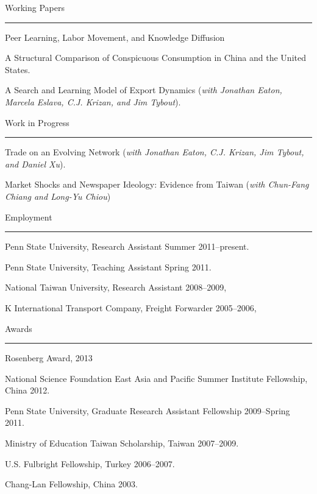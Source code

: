 \documentclass[letterpaper]{article}
\renewenvironment{itemize}{
    \begin{list}{}{
            \setlength{\leftmargin}{1.5em}
            \setlength{\parskip}{0pt}
            \setlength{\parsep}{0pt}
        }
    }{
    \end{list}
}
\begin{document}
\vspace{4mm}
{\Large Working Papers}
\vspace{1mm}
\hrule
\begin{itemize}
    \item Peer Learning, Labor Movement, and Knowledge Diffusion
    \item A Structural Comparison of Conspicuous Consumption in China and the United States.
    \item A Search and Learning Model of Export Dynamics (\emph{with Jonathan Eaton, Marcela Eslava, C.J. Krizan, and Jim Tybout}).
\end{itemize}

\vspace{4mm}
{\Large Work in Progress}
\vspace{1mm}
\hrule
\begin{itemize}
    \item Trade on an Evolving Network (\emph{with Jonathan Eaton, C.J. Krizan, Jim Tybout, and Daniel Xu}).
    \item Market Shocks and Newspaper Ideology: Evidence from Taiwan (\emph{with Chun-Fang Chiang and Long-Yu Chiou})
\end{itemize}

\vspace{4mm}
{\Large Employment}
\hrule
\begin{itemize}
    \item Penn State University, Research Assistant Summer 2011--present.
    \item Penn State University, Teaching Assistant Spring 2011.
    \item National Taiwan University, Research Assistant 2008--2009,
    \item K International Transport Company, Freight Forwarder 2005--2006,
\end{itemize}

\vspace{4mm}
{\Large Awards}
\vspace{1mm}
\hrule
\begin{itemize}
    \item Rosenberg Award, 2013
    \item National Science Foundation East Asia and Pacific Summer Institute Fellowship, China 2012.
    \item Penn State University, Graduate Research Assistant Fellowship 2009--Spring 2011.
    \item Ministry of Education Taiwan Scholarship, Taiwan 2007--2009.
    \item U.S. Fulbright Fellowship, Turkey 2006--2007.
    \item Chang-Lan Fellowship, China 2003.
\end{itemize}
\end{document}
